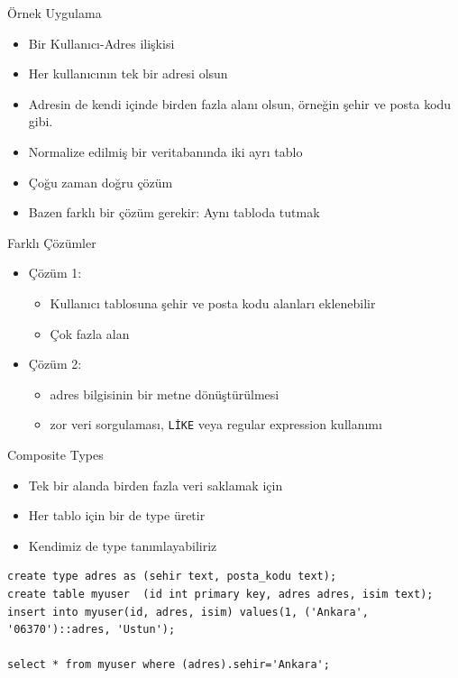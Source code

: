 \documentclass[presentation]{beamer}
\begin{document}
\begin{frame}[label=sec-21]{Örnek Uygulama}
\begin{itemize}
\item Bir Kullanıcı-Adres ilişkisi
\item Her kullanıcının tek bir adresi olsun
\item Adresin de kendi içinde birden fazla alanı olsun, örneğin şehir ve posta kodu gibi.

\item Normalize edilmiş bir veritabanında iki ayrı tablo
\item Çoğu zaman doğru çözüm
\item Bazen farklı bir çözüm gerekir: Aynı tabloda tutmak
\end{itemize}
\end{frame}

\begin{frame}[fragile,label=sec-22]{Farklı Çözümler}
 \begin{itemize}
\item Çözüm 1:
\begin{itemize}
\item Kullanıcı tablosuna şehir ve posta kodu alanları eklenebilir
\item Çok fazla alan
\end{itemize}
\item Çözüm 2:
\begin{itemize}
\item adres bilgisinin bir metne dönüştürülmesi
\item zor veri sorgulaması, \texttt{LİKE} veya regular expression kullanımı
\end{itemize}
\end{itemize}
\end{frame}

\begin{frame}[fragile,label=sec-23]{Composite Types}
 \begin{itemize}
\item Tek bir alanda birden fazla veri saklamak için
\item Her tablo için bir de type üretir
\item Kendimiz de type tanımlayabiliriz
\end{itemize}

\begin{verbatim}
create type adres as (sehir text, posta_kodu text);
create table myuser  (id int primary key, adres adres, isim text);
insert into myuser(id, adres, isim) values(1, ('Ankara', '06370')::adres, 'Ustun');

select * from myuser where (adres).sehir='Ankara';
\end{verbatim}
\end{frame}
\end{document}
